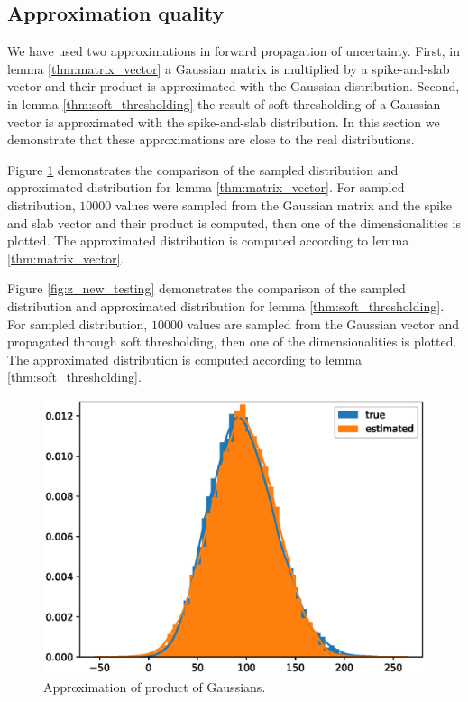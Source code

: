 \documentclass[letterpaper]{article}
\begin{document}
\subsection{Approximation quality}
\label{sec:approx_quality}
We have used two approximations in forward propagation of uncertainty. First, in lemma \ref{thm:matrix_vector} a Gaussian matrix is multiplied by a spike-and-slab vector and their product is approximated with the Gaussian distribution. Second, in lemma \ref{thm:soft_thresholding} the result of soft-thresholding of a Gaussian vector is approximated with the spike-and-slab distribution. In this section we demonstrate that these approximations are close to the real distributions.

Figure \ref{fig:d_testing} demonstrates the comparison of the sampled distribution and approximated distribution for lemma \ref{thm:matrix_vector}. For sampled distribution, $10000$ values were sampled from the Gaussian matrix and the spike and slab vector and their product is computed, then one of the dimensionalities is plotted. The approximated distribution is computed according to lemma \ref{thm:matrix_vector}.

Figure \ref{fig:z_new_testing} demonstrates the comparison of the sampled distribution and approximated distribution for lemma \ref{thm:soft_thresholding}. For sampled distribution, $10000$ values are sampled from the Gaussian vector and propagated through soft thresholding, then one of the dimensionalities is plotted. The approximated distribution is computed according to lemma \ref{thm:soft_thresholding}.
\begin{figure}[t]
\includegraphics[width=\columnwidth]{d_testing}
\caption{Approximation of product of Gaussians.}
\label{fig:d_testing}
\end{figure}
\end{document}
